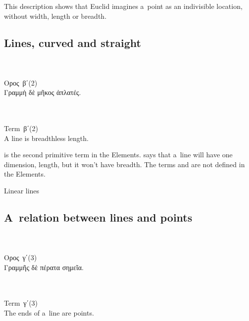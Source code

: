 This description
shows that
Euclid imagines a~point
as
an indivisible location,
without width,
length
or
breadth.

\subsection{Lines, curved and straight}

{\small
\setlength{\parindent}{0pt}

\nopagebreak%
\begin{multicols}{2}
%
\\
\\[.3em]
\textgreek{Ορος}~\textgreek{β΄}\:(2)\\[.1em]
\textgreek{Γραμμὴ δὲ μῆκος ἀπλατές.}

\columnbreak
%
\\
\\[.3em]
Term~\textgreek{β΄}\:(2)\\[.1em]
A line is breadthless length.
%
\end{multicols}
\par}

 is the second primitive term in the Elements.
says that a~line will have one dimension, length, but it won’t have breadth.
The terms  and  are not defined in the Elements.

Linear lines

\subsection{A~relation between lines and points}

{\small
\setlength{\parindent}{0pt}

\nopagebreak%
\begin{multicols}{2}
%
\\
\\[.3em]
\textgreek{Ορος}~\textgreek{γ΄}\:(3)\\[.1em]
\textgreek{Γραμμῆς δὲ πέρατα σημεῖα.}

\columnbreak
%
\\
\\[.3em]
Term~\textgreek{γ΄}\:(3)\\[.1em]
The ends of a~line are points.
%
\end{multicols}
\par}

